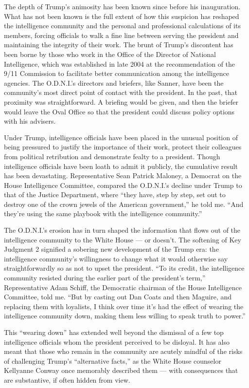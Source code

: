 The depth of Trump's animosity has been known since before his
inauguration. What has not been known is the full extent of how this
suspicion has reshaped the intelligence community and the personal and
professional calculations of its members, forcing officials to walk a
fine line between serving the president and maintaining the integrity of
their work. The brunt of Trump's discontent has been borne by those who
work in the Office of the Director of National Intelligence, which was
established in late 2004 at the recommendation of the 9/11 Commission to
facilitate better communication among the intelligence agencies. The
O.D.N.I.'s directors and briefers, like Sanner, have been the
community's most direct point of contact with the president. In the
past, that proximity was straightforward. A briefing would be given, and
then the briefer would leave the Oval Office so that the president could
discuss policy options with his advisers.

Under Trump, intelligence officials have been placed in the unusual
position of being pressured to justify the importance of their work,
protect their colleagues from political retribution and demonstrate
fealty to a president. Though intelligence officials have been loath to
admit it publicly, the cumulative result has been devastating.
Representative Sean Patrick Maloney, a Democrat on the House
Intelligence Committee, compared the O.D.N.I.'s decline under Trump to
that of the Justice Department, where ``they have, step by step, set out
to destroy one of the crown jewels of the American government,'' he told
me. ``And they're using the same playbook with the intelligence
community.''

The O.D.N.I.'s erosion has in turn shaped the information that flows out
of the intelligence community to the White House --- or doesn't. The
softening of Key Judgment 2 signified a sobering new development of the
Trump era: the intelligence community's willingness to change what it
would otherwise say straightforwardly so as not to upset the president.
``To its credit, the intelligence community resisted during the earlier
part of the president's term,'' Representative Adam Schiff, the
Democratic chairman of the House Intelligence Committee, told me. ``But
by casting out Dan Coats and then Maguire, and replacing them with
loyalists, I think over time it's had the effect of wearing the
intelligence community down, making them less willing to speak truth to
power.''

This ``wearing down'' has extended well beyond the dismissal of a few
top intelligence officials whom the president perceived to be disloyal.
It has also meant that those who remain in the community are acutely
mindful of the risks of challenging Trump's ``alternative facts,'' as
the White House counselor Kellyanne Conway once memorably described them
--- with consequences that are substantive, if often hidden from view.

